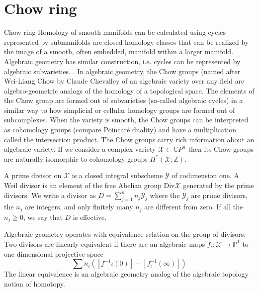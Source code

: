\documentclass{beamer}
\theoremstyle{plain}
\newcommand{\be}{\begin{equation}}
\newcommand{\ee}{\end{equation}}
\newcommand{\C}{\mathbb{C}}
\newcommand{\sX}{\mathcal{X}}       %
\newcommand{\sY}{\mathcal{Y}}       %
\begin{document}
\section{Chow ring}
  \begin{frame}
  	{\Large Chow ring}
  	Homology of smooth manifolds can be calculated using 
  cycles represented by submanifolds are closed homology classes that can be realized by the image of a smooth, often embedded, manifold within a larger manifold. Algebraic geometry has similar construction, i.e. cycles can be represented by algebraic subvarieties.
  	.
  In algebraic geometry, the \alert{Chow groups} (named after Wei-Liang Chow by Claude Chevalley  of an algebraic variety over any field are algebro-geometric analogs of the homology of a topological space. The elements of the Chow group are formed out of subvarieties (so-called algebraic cycles) in a similar way to how simplicial or cellular homology groups are formed out of subcomplexes. When the variety is smooth, the Chow groups can be interpreted as cohomology groups (compare Poincaré duality) and have a multiplication called the intersection product. The Chow groups carry rich information about an algebraic variety. If we consider a complex variety $\sX\subset \C P^n$ then its  Chow groups are naturally isomorphic to cohomology groups $H^*\left( \sX ; \mathbb{Z}\right)$. 
  \end{frame}
  \begin{frame}
\begin{definition}\label{prime_divisor_dern}
 A \alert{ prime divisor} on $\sX$ is a closed integral subscheme $\sY$ of codimension one. A \alert{ Weil divisor} is an element of the free Abelian group $\mathrm{Div}\sX$ generated by the prime divisors. We write a divisor as $D =\sum_{j=1}^n n_j \sY_j $  where the $\sY_j$ are prime divisors, the $n_j$ are integers, and 
	only finitely many $n_j$ are different from zero. If all the $n_j \ge 0$, we say 
	that $D$ is \alert{ effective}. 
\end{definition}
Algebraic geometry operates with equivalence relation on the group of divisors. Two divisors are 
\alert{linearly equivalent} if there are an algebraic maps $f_\iota : \sX \to \mathbb P^1$ to one dimensional projective space
\be\label{projective_sum_eqn}
\sum n_\iota \left(\left[f^{-1}\iota\left(0 \right) \right]- \left[f^{-1}_\iota\left(\infty \right) \right] \right) 
\ee 
The linear equivalence is an algebraic geometry analog of the algebraic topology notion of homotopy.
  \end{frame} 
\end{document}
